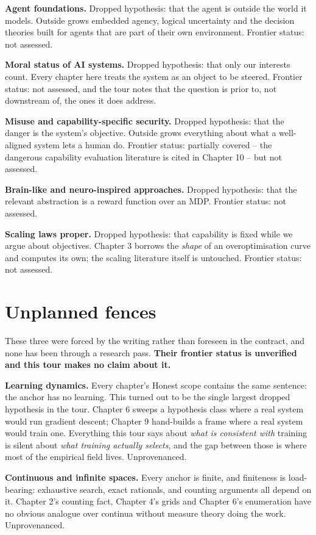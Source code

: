 \textbf{Agent foundations.} Dropped hypothesis: that the agent is outside the world it models. Outside grows embedded agency, logical uncertainty and the decision theories built for agents that are part of their own environment. Frontier status: not assessed.

\textbf{Moral status of AI systems.} Dropped hypothesis: that only our interests count. Every chapter here treats the system as an object to be steered. Frontier status: not assessed, and the tour notes that the question is prior to, not downstream of, the ones it does address.

\textbf{Misuse and capability-specific security.} Dropped hypothesis: that the danger is the system's objective. Outside grows everything about what a well-aligned system lets a human do. Frontier status: partially covered -- the dangerous capability evaluation literature is cited in Chapter 10 -- but not assessed.

\textbf{Brain-like and neuro-inspired approaches.} Dropped hypothesis: that the relevant abstraction is a reward function over an MDP. Frontier status: not assessed.

\textbf{Scaling laws proper.} Dropped hypothesis: that capability is fixed while we argue about objectives. Chapter 3 borrows the \emph{shape} of an overoptimisation curve and computes its own; the scaling literature itself is untouched. Frontier status: not assessed.

\section*{Unplanned fences}

These three were forced by the writing rather than foreseen in the contract, and none has been through a research pass. \textbf{Their frontier status is unverified and this tour makes no claim about it.}

\textbf{Learning dynamics.} Every chapter's Honest scope contains the same sentence: the anchor has no learning. This turned out to be the single largest dropped hypothesis in the tour. Chapter 6 sweeps a hypothesis class where a real system would run gradient descent; Chapter 9 hand-builds a frame where a real system would train one. Everything this tour says about \emph{what is consistent with} training is silent about \emph{what training actually selects}, and the gap between those is where most of the empirical field lives. Unprovenanced.

\textbf{Continuous and infinite spaces.} Every anchor is finite, and finiteness is load-bearing: exhaustive search, exact rationals, and counting arguments all depend on it. Chapter 2's counting fact, Chapter 4's grids and Chapter 6's enumeration have no obvious analogue over continua without measure theory doing the work. Unprovenanced.


